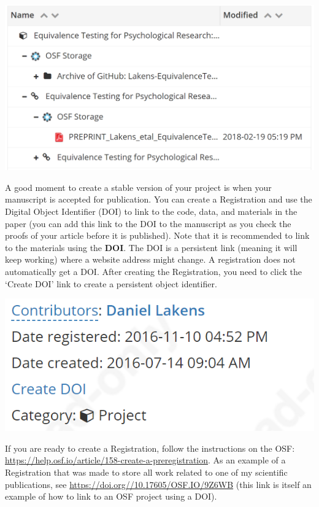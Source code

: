 \documentclass[
  oneside]{book}
\begin{document}
\begin{center}\includegraphics[width=1\linewidth]{images/e0b28289fbe42988cbe04111e4aee6ad} \end{center}

A good moment to create a stable version of your project is when your manuscript is accepted for publication. You can create a Registration and use the Digital Object Identifier (DOI) to link to the code, data, and materials in the paper (you can add this link to the DOI to the manuscript as you check the proofs of your article before it is published). Note that it is recommended to link to the materials using the \textbf{DOI}. The DOI is a persistent link (meaning it will keep working) where a website address might change. A registration does not automatically get a DOI. After creating the Registration, you need to click the `Create DOI' link to create a persistent object identifier.

\begin{center}\includegraphics[width=1\linewidth]{images/502f57cf747457838ed0a0e2c5af0496} \end{center}

If you are ready to create a Registration, follow the instructions on the OSF: \url{https://help.osf.io/article/158-create-a-preregistration}. As an example of a Registration that was made to store all work related to one of my scientific publications, see \url{https://doi.org//10.17605/OSF.IO/9Z6WB} (this link is itself an example of how to link to an OSF project using a DOI).
\end{document}
